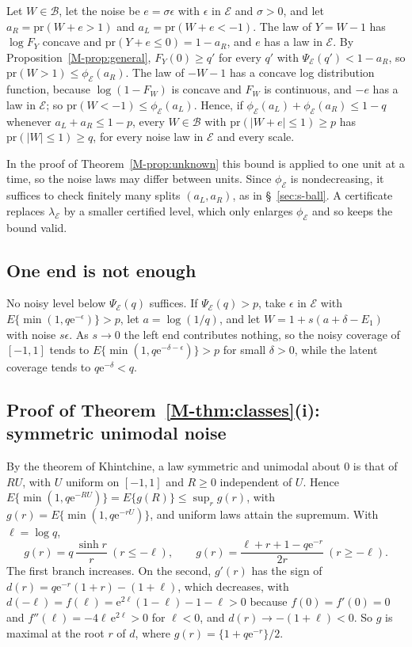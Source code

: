\documentclass[11pt]{article}
\renewcommand{\_}{\usc\allowbreak}
\newcommand{\pr}{\mathrm{pr}}
\begin{document}
Let $W \in \mathcal B$, let the noise be $e = \sigma\epsilon$ with $\epsilon$ in $\mathcal E$ and $\sigma > 0$, and let $a_R = \pr(W + e > 1)$ and $a_L = \pr(W + e < -1)$. The law of $Y = W - 1$ has $\log F_Y$ concave and $\pr(Y + e \le 0) = 1 - a_R$, and $e$ has a law in $\mathcal E$. By Proposition~\ref{M-prop:general}, $F_Y(0) \ge q'$ for every $q'$ with $\Psi_{\mathcal E}(q') < 1 - a_R$, so $\pr(W > 1) \le \phi_{\mathcal E}(a_R)$. The law of $-W - 1$ has a concave log distribution function, because $\log(1 - F_W)$ is concave and $F_W$ is continuous, and $-e$ has a law in $\mathcal E$; so $\pr(W < -1) \le \phi_{\mathcal E}(a_L)$. Hence, if $\phi_{\mathcal E}(a_L) + \phi_{\mathcal E}(a_R) \le 1 - q$ whenever $a_L + a_R \le 1 - p$, every $W \in \mathcal B$ with $\pr(|W + e| \le 1) \ge p$ has $\pr(|W| \le 1) \ge q$, for every noise law in $\mathcal E$ and every scale.

In the proof of Theorem~\ref{M-prop:unknown} this bound is applied to one unit at a time, so the noise laws may differ between units. Since $\phi_{\mathcal E}$ is nondecreasing, it suffices to check finitely many splits $(a_L, a_R)$, as in \S~\ref{sec:s-ball}. A certificate replaces $\lambda_{\mathcal E}$ by a smaller certified level, which only enlarges $\phi_{\mathcal E}$ and so keeps the bound valid.

\subsection*{One end is not enough}\label{sec:s-oneend}

No noisy level below $\Psi_{\mathcal E}(q)$ suffices. If $\Psi_{\mathcal E}(q) > p$, take $\epsilon$ in $\mathcal E$ with $E\{\min(1, q \mathrm{e}^{-\epsilon})\} > p$, let $a = \log(1/q)$, and let $W = 1 + s(a + \delta - E_1)$ with noise $s\epsilon$. As $s \to 0$ the left end contributes nothing, so the noisy coverage of $[-1, 1]$ tends to $E\{\min(1, q \mathrm{e}^{-\delta - \epsilon})\} > p$ for small $\delta > 0$, while the latent coverage tends to $q \mathrm{e}^{-\delta} < q$.

\subsection*{Proof of Theorem~\ref{M-thm:classes}(i): symmetric unimodal noise}

By the theorem of Khintchine, a law symmetric and unimodal about $0$ is that of $RU$, with $U$ uniform on $[-1, 1]$ and $R \ge 0$ independent of $U$. Hence $E\{\min(1, q \mathrm{e}^{-RU})\} = E\{g(R)\} \le \sup_r g(r)$, with $g(r) = E\{\min(1, q \mathrm{e}^{-rU})\}$, and uniform laws attain the supremum. With $\ell = \log q$,
\[
g(r) = q\,\frac{\sinh r}{r}\ (r \le -\ell), \qquad g(r) = \frac{\ell + r + 1 - q \mathrm{e}^{-r}}{2r}\ (r \ge -\ell).
\]
The first branch increases. On the second, $g'(r)$ has the sign of $d(r) = q \mathrm{e}^{-r}(1 + r) - (1 + \ell)$, which decreases, with $d(-\ell) = f(\ell) = \mathrm{e}^{2\ell}(1 - \ell) - 1 - \ell > 0$ because $f(0) = f'(0) = 0$ and $f''(\ell) = -4\ell\,\mathrm{e}^{2\ell} > 0$ for $\ell < 0$, and $d(r) \to -(1 + \ell) < 0$. So $g$ is maximal at the root $r$ of $d$, where $g(r) = \{1 + q \mathrm{e}^{-r}\}/2$.
\end{document}
